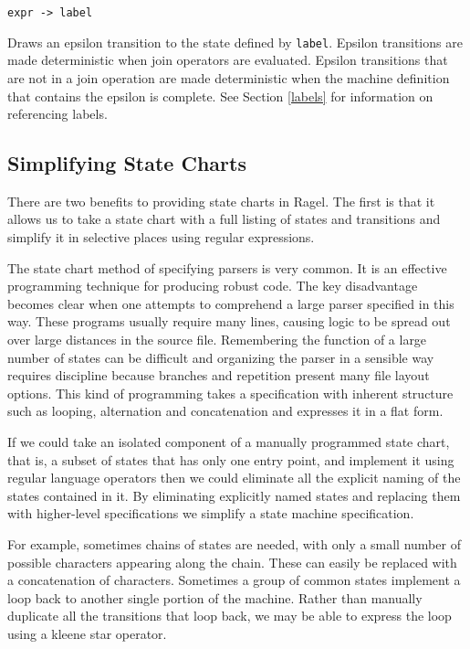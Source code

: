 \documentclass[letterpaper,11pt,oneside]{book}
\newcommand{\verbspace}{\vspace{10pt}}
\begin{document}
\verb|expr -> label| 
\verbspace

Draws an epsilon transition to the state defined
by \verb|label|.  Epsilon transitions are made deterministic when join
operators are evaluated. Epsilon transitions that are not in a join operation
are made deterministic when the machine definition that contains the epsilon is
complete. See Section \ref{labels} for information on referencing labels.

\subsection{Simplifying State Charts}

There are two benefits to providing state charts in Ragel. The first is that it
allows us to take a state chart with a full listing of states and transitions
and simplify it in selective places using regular expressions.

The state chart method of specifying parsers is very common.  It is an
effective programming technique for producing robust code. The key disadvantage
becomes clear when one attempts to comprehend a large parser specified in this
way.  These programs usually require many lines, causing logic to be spread out
over large distances in the source file. Remembering the function of a large
number of states can be difficult and organizing the parser in a sensible way
requires discipline because branches and repetition present many file layout
options.  This kind of programming takes a specification with inherent
structure such as looping, alternation and concatenation and expresses it in a
flat form. 

If we could take an isolated component of a manually programmed state chart,
that is, a subset of states that has only one entry point, and implement it
using regular language operators then we could eliminate all the explicit
naming of the states contained in it. By eliminating explicitly named states
and replacing them with higher-level specifications we simplify a state machine
specification.

For example, sometimes chains of states are needed, with only a small number of
possible characters appearing along the chain. These can easily be replaced
with a concatenation of characters. Sometimes a group of common states
implement a loop back to another single portion of the machine. Rather than
manually duplicate all the transitions that loop back, we may be able to
express the loop using a kleene star operator.
\end{document}
